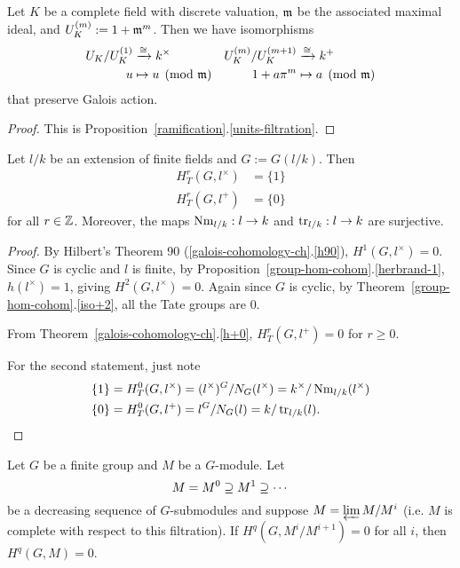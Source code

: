 \begin{pr}
Let $K$ be a complete field with discrete valuation, $\mathfrak{m}$ be the associated maximal ideal, and $U_K^{(m)}:=1+\mathfrak{m}^m$. Then we have isomorphisms
\begin{align*}
U_K/U_K^{(1)}&\xrightarrow{\cong} k^{\times}&
U_K^{(m)}/U_K^{(m+1)}&\xrightarrow{\cong} k^+\\
u&\mapsto u\pmod{\mathfrak{m}}&
1+a\pi^m&\mapsto a\pmod{\mathfrak{m}}
\end{align*}
that preserve Galois action.
\end{pr}
\begin{proof}
This is Proposition~\ref{ramification}.\ref{units-filtration}.
\end{proof}
\begin{pr}
Let $l/k$ be an extension of finite fields and $G:=G(l/k)$. Then
\begin{align*}
H_T^r(G,l^{\times})&=\{1\}\\
H_T^r(G,l^{+})&=\{0\}
\end{align*}
for all $r\in \mathbb{Z}$. Moreover, the maps $\operatorname{Nm}_{l/k}:l\to k$ and $\operatorname{tr}_{l/k}:l\to k$ are surjective.
\end{pr}
\begin{proof}
By Hilbert's Theorem 90 (\ref{galois-cohomology-ch}.\ref{h90}), $H^1(G,l^{\times})=0$. Since $G$ is cyclic and $l$ is finite, by Proposition~\ref{group-hom-cohom}.\ref{herbrand-1}, $h(l^{\times})=1$, giving $H^2(G,l^{\times})=0$. Again since $G$ is cyclic, by Theorem~\ref{group-hom-cohom}.\ref{iso+2}, all the Tate groups are 0.

From Theorem~\ref{galois-cohomology-ch}.\ref{h+0}, $H_T^r(G,l^+)=0$ for $r\ge 0$. %

For the second statement, just note
\begin{align*}
\{1\}&=H_T^0(G,l^{\times})=(l^{\times})^G/N_G(l^{\times})
=k^{\times}/\operatorname{Nm}_{l/k}(l^{\times})\\
\{0\}&=H_T^0(G,l^{+})=l^G/N_G(l)
=k/\operatorname{tr}_{l/k}(l).\qedhere
\end{align*}
\end{proof}
\begin{lem}
Let $G$ be a finite group and $M$ be a $G$-module. Let
\[
M=M^0\supseteq M^1\supseteq\cdots 
\]
be a decreasing sequence of $G$-submodules and suppose $M=\varprojlim M/M^i$ (i.e. $M$ is complete with respect to this filtration). If $H^q(G,M^i/M^{i+1})=0$ for all $i$, then $H^q(G,M)=0$.
\end{lem}
